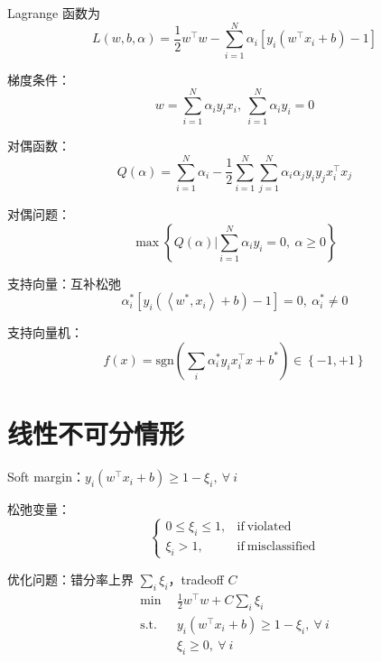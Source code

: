 \documentclass[openany]{ctexbook}
\theoremstyle{kaiti}
\theoremstyle{normal}
\begin{document}
Lagrange 函数为
\begin{equation}
  L\left(w,b,\alpha \right)=\frac{1}{2}w^{\top}w-\sum_{i=1}^{N}\alpha_i\left[y_i\left(w^{\top}x_i+b \right)-1 \right]
\end{equation}

梯度条件：
\begin{equation}
  w=\sum_{i=1}^{N}\alpha_iy_ix_i,~\sum_{i=1}^{N}\alpha_iy_i=0
\end{equation}

对偶函数：
\begin{equation}
  Q\left(\alpha \right)=\sum_{i=1}^{N}\alpha_i-\frac{1}{2}\sum_{i=1}^{N}\sum_{j=1}^{N}\alpha_i\alpha_jy_iy_jx_{i}^{\top}x_j
\end{equation}

对偶问题：
\begin{equation}
  \max \left\{ Q\left(\alpha \right)|\sum_{i=1}^{N}\alpha_iy_i=0,~\alpha \geqslant 0 \right\}
\end{equation}

支持向量：互补松弛
\begin{equation}
  \alpha_{i}^{*}\left[y_i\left(\left< w^*,x_i \right> +b \right)-1 \right] =0,~\alpha_{i}^{*}\ne 0
\end{equation}

支持向量机：
\begin{equation}
  f(x)=\mathrm{sgn} \left(\sum_i\alpha_{i}^{*}y_ix_{i}^{\top}x+b^* \right)\in \left\{ -1,+1 \right\}
\end{equation}

\section{线性不可分情形}

Soft margin：$y_i\left(w^{\top}x_i+b \right)\geqslant 1-\xi_i,~\forall~i$

松弛变量：
\begin{equation}
  \begin{cases}
    0\leqslant \xi_i\leqslant 1, &\mathrm{if}~\mathrm{violated}\\
    \xi_i>1, &\mathrm{if}~\mathrm{misclassified}
  \end{cases}
\end{equation}

优化问题：错分率上界 $\sum_i\xi_i$，tradeoff $C$
\begin{equation}
  \begin{aligned}
    \min~~&\frac{1}{2}w^{\top}w+C\sum_i\xi_i\\
    \mathrm{s.t.}~~& y_i\left(w^{\top}x_i+b \right)\geqslant 1-\xi_i,~\forall~i\\
    &\xi_i\geqslant 0,~\forall~i
  \end{aligned}
\end{equation}
\end{document}
